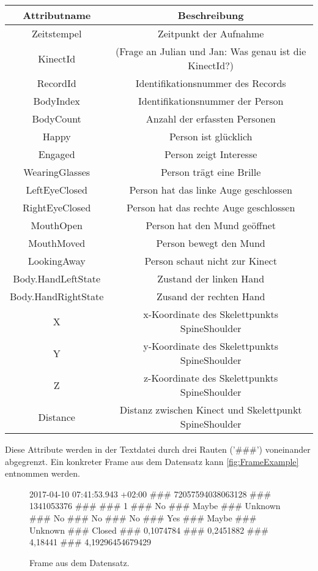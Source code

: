 \begin{center}
  \begin{tabular}{ |c|c| } 
   \hline
   Attributname & Beschreibung \\
   \hline \hline
   Zeitstempel & Zeitpunkt der Aufnahme \\
   \hline
   KinectId & (Frage an Julian und Jan: Was genau ist die KinectId?) \\
   \hline
   RecordId & Identifikationsnummer des Records \\
   \hline
   BodyIndex & Identifikationsnummer der Person \\
   \hline
   BodyCount & Anzahl der erfassten Personen \\
   \hline
   Happy & Person ist glücklich \\
   \hline
   Engaged & Person zeigt Interesse \\
   \hline
   WearingGlasses & Person trägt eine Brille \\
   \hline
   LeftEyeClosed & Person hat das linke Auge geschlossen \\
   \hline
   RightEyeClosed & Person hat das rechte Auge geschlossen \\
   \hline
   MouthOpen & Person hat den Mund geöffnet \\
   \hline
   MouthMoved & Person bewegt den Mund\\
   \hline
   LookingAway & Person schaut nicht zur Kinect \\
   \hline
   Body.HandLeftState & Zustand der linken Hand \\
   \hline
   Body.HandRightState & Zusand der rechten Hand \\
   \hline
   X & x-Koordinate des Skelettpunkts SpineShoulder \\
   \hline
   Y & y-Koordinate des Skelettpunkts SpineShoulder \\
   \hline
   Z & z-Koordinate des Skelettpunkts SpineShoulder \\
   \hline
   Distance & Distanz zwischen Kinect und Skelettpunkt SpineShoulder \\
   \hline
  \end{tabular}
\end{center}
Diese Attribute werden in der Textdatei durch drei Rauten ('\#\#\#') voneinander abgegrenzt.
Ein konkreter Frame aus dem Datensatz kann \autoref{fig:FrameExample} entnommen werden.

\begin{figure}[ht]
  \begin{center}
    2017-04-10 07:41:53.943 +02:00 \#\#\# 72057594038063128 \#\#\# 1341053376 \#\#\# 
    \newline \#\#\# 1 \#\#\# No \#\#\# Maybe \#\#\# Unknown \#\#\# No \#\#\# No \#\#\#
    \newline No \#\#\# Yes \#\#\# Maybe \#\#\# Unknown \#\#\# Closed \#\#\# 0,1074784
    \newline \#\#\# 0,2451882 \#\#\# 4,18441 \#\#\# 4,19296454679429
  \end{center}
  \caption{Frame aus dem Datensatz.}
  \label{fig:FrameExample}
\end{figure}

